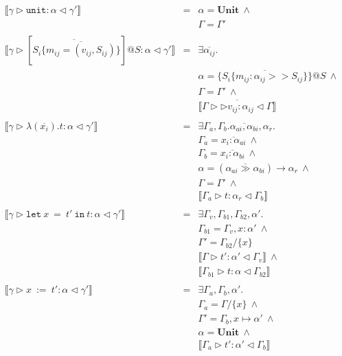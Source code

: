 \documentclass{article}
\newcommand{\inferrule}[4]{\llbracket #1 \triangleright #2 : #3 \triangleleft #4 \rrbracket}
\newcommand{\inferlhs}[1]{\llbracket \gamma \triangleright #1 : \alpha \triangleleft \gamma' \rrbracket}
\newcommand{\unitv}{\mathtt{unit}}
\newcommand{\unitt}{\mathbf{Unit}}
\newcommand{\lett}[3]{\mathtt{let}\:#1\:\mathtt{=}\:#2\:\mathtt{in}\:#3}
\begin{document}
\[
\begin{array}{lll}

\inferlhs{\unitv}
& = & 
\alpha = \unitt\:\wedge 
\\ && 
\Gamma = \Gamma' 
\\
\\

\inferlhs{[ \overline{S_i \{ \overline{ m_{ij} = (v_{ij}, S_{ij}) } } \} ]@S}
& = & 
\exists \overline{\alpha_{ij}} .
\\ && 
\alpha = \{ \overline{ S_i \{ m_{ij} : \alpha_{ij} >> S_{ij} \} }\}@S\:\wedge
\\ && 
\Gamma = \Gamma'\:\wedge
\\ && 
\overline{\inferrule{\Gamma}{\triangleright v_{ij}}{\alpha_{ij}}{\Gamma}}
\\
\\

\inferlhs{\lambda ( \overline{x_i} ) . t}
& = &
\exists \Gamma_a, \Gamma_b . \overline{\alpha_{ai}, \alpha_{bi}}, \alpha_r . 
\\ && 
\Gamma_a = \overline{x_i : \alpha_{ai}}\:\wedge 
\\ && 
\Gamma_b = \overline{x_i : \alpha_{bi}}\:\wedge
\\ && 
\alpha = (\overline{\alpha_{ai} \gg \alpha_{bi}}) \rightarrow \alpha_r\:\wedge
\\ && 
\Gamma = \Gamma'\:\wedge
\\ && 
\inferrule{\Gamma_a}{t}{\alpha_r}{\Gamma_b} 
\\
\\

\inferlhs{\lett{x}{t'}{t}}
& = & 
\exists \Gamma_v, \Gamma_{b1}, \Gamma_{b2}, \alpha' . 
\\ && 
\Gamma_{b1} = \Gamma_v, x : \alpha'\:\wedge
\\ &&
\Gamma' = \Gamma_{b2} / \{ x \}
\\ &&
\inferrule{\Gamma}{t'}{\alpha'}{\Gamma_v}\:\wedge
\\ && 
\inferrule{\Gamma_{b1}}{t}{\alpha}{\Gamma_{b2}}
\\ && 
\\

\inferlhs{x\:\mathtt{:=}\:t'}
& = &
\exists \Gamma_a, \Gamma_b, \alpha' .
\\ &&
\Gamma_a = \Gamma / \{ x \}\:\wedge
\\ && 
\Gamma' = \Gamma_b, x \mapsto \alpha'\:\wedge
\\ && 
\alpha = \unitt\:\wedge
\\ && 
\inferrule{\Gamma_a}{t'}{\alpha'}{\Gamma_b}
\\
\\


\end{array}\]
\end{document}
